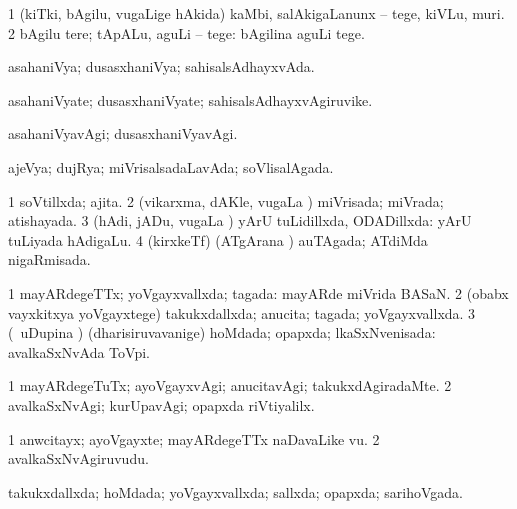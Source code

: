 {\bentry
{} 
\gl{\sakirx}
\bmng
\bnum
\num{1} (kiTki, bAgilu, \mo vugaLige hAkida) kaMbi, salAkigaLanunx -- tege, kiVLu, muri. 
\num{2} bAgilu tere; tApALu, aguLi -- tege:  bAgilina aguLi tege. 
\enum
\emng
\eentry

\bentry
{} 
\gl{\gu}
\expl{}
\bmng
asahaniVya; dusasxhaniVya; sahisalsAdhayxvAda. 
\emng
\eentry

\bentry
{} 
\gl{\nA}
\expl{}
\bmng
asahaniVyate; dusasxhaniVyate; sahisalsAdhayxvAgiruvike. 
\emng
\eentry

\bentry
{} 
\gl{\kirxvi}
\expl{}
\bmng
asahaniVyavAgi; dusasxhaniVyavAgi. 
\emng
\eentry

\bentry
{} 
\gl{\gu}
\expl{}
\bmng
ajeVya; dujRya; miVrisalsadaLavAda; soVlisalAgada. 
\emng
\eentry

\bentry
{} 
\gl{\gu}
\expl{}
\bmng
\bnum
\num{1} soVtillxda; ajita. 
\num{2} (vikarxma, dAKle, \mo vugaLa \vi) miVrisada; miVrada; atishayada. 
\num{3} (hAdi, jADu, \mo vugaLa \vi) yArU tuLidillxda, ODADillxda:  yArU tuLiyada hAdigaLu. 
\num{4} (kirxkeTf) (ATgArana \vi) auTAgada; ATdiMda nigaRmisada. 
\enum
\emng
\eentry

\bentry
{} 
\gl{\gu}
\expl{}
\bmng
\bnum
\num{1} mayARdegeTTx; yoVgayxvallxda; tagada:  mayARde miVrida BASaN. 
\num{2} (obabx vayxkitxya yoVgayxtege) takukxdallxda; anucita; tagada; yoVgayxvallxda. 
\num{3} (\kanmu\ uDupina \vi) (dharisiruvavanige) hoMdada; opapxda; lkaSxNvenisada:  avalkaSxNvAda ToVpi. 
\enum
\emng
\eentry

\bentry
{} 
\gl{\kirxvi}
\expl{}
\bmng
\bnum
\num{1} mayARdegeTuTx; ayoVgayxvAgi; anucitavAgi; takukxdAgiradaMte. 
\num{2} avalkaSxNvAgi; kurUpavAgi; opapxda riVtiyalilx. 
\enum
\emng
\eentry

\bentry
{} 
\gl{\nA}
\expl{}
\bmng
\bnum
\num{1} anwcitayx; ayoVgayxte; mayARdegeTTx naDavaLike \mo vu. 
\num{2} avalkaSxNvAgiruvudu. 
\enum
\emng
\eentry

\bentry
{} 
\gl{\gu}
\expl{}
\bmng
takukxdallxda; hoMdada; yoVgayxvallxda; sallxda; opapxda; sarihoVgada. 
\emng
\eentry

}
